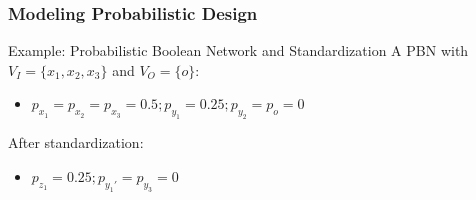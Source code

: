 \begin{frame}
  \frametitle{Modeling Probabilistic Design}
  \begin{block}{Example: Probabilistic Boolean Network and Standardization}
    A PBN with $V_I=\{x_1,x_2,x_3\}$ and $V_O=\{o\}$:
    \begin{figure}
      \centering
      
    \end{figure}
    \begin{itemize}
      \item $p_{x_1}=p_{x_2}=p_{x_3}=0.5;p_{y_1}=0.25;p_{y_2}=p_{o}=0$
    \end{itemize}
    After standardization:
    \begin{figure}
      \centering
      
    \end{figure}
    \begin{itemize}
      \item $p_{z_1}=0.25;p_{y_1'}=p_{y_3}=0$
    \end{itemize}
  \end{block}
\end{frame}